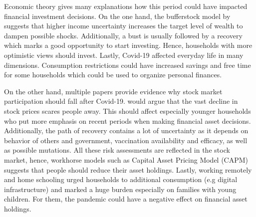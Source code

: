 \documentclass[ProjectABM]{subfiles}
\begin{document}


Economic theory gives many explanations how this period could have impacted financial investment decisions. On the one hand, the bufferstock model by \cite{carroll2009bufferstock} suggests that higher income uncertainty increases the target level of wealth to dampen possible shocks. %
Additionally, a bust is usually followed by a recovery which marks a good opportunity to start investing. Hence, households with more optimistic views should invest. Lastly, Covid-19 affected everyday life in many dimensions. Consumption restrictions could have increased savings and free time for some households which could be used to organize personal finances. 

On the other hand, multiple papers provide evidence why stock market participation should fall after Covid-19. \cite{malmendier_2011} would argue that the vast decline in stock prices scares people away. This should affect especially younger households who put more emphasis on recent periods when making financial asset decisions. Additionally, the path of recovery contains a lot of uncertainty as it depends on behavior of others and government, vaccination availability and efficacy, as well as possible mutations. All these risk assessments are reflected in the stock market, hence, workhorse models such as Capital Asset Pricing Model (CAPM) suggests that people should reduce their asset holdings. Lastly, working remotely and home schooling urged households to additional consumption (e.g digital infrastructure) and marked a huge burden especially on families with young children. For them, the pandemic could have a negative effect on financial asset holdings.
\end{document}

